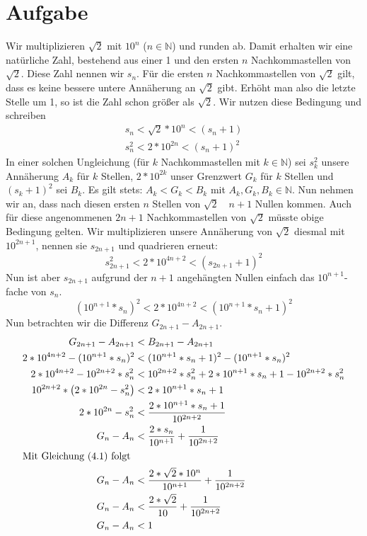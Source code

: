 \documentclass{article}
\numberwithin{equation}{section}
\begin{document}
\section{Aufgabe}
	Wir multiplizieren $\sqrt{2}$ mit $10^n$ ($n\in \mathbb{N}$) und runden ab. Damit erhalten wir eine natürliche Zahl, bestehend aus einer 1 und den ersten $n$ Nachkommastellen von $\sqrt{2}$. Diese Zahl nennen wir $s_n$. Für die ersten $n$ Nachkommastellen von $\sqrt{2}$ gilt, dass es keine bessere untere Annäherung an $\sqrt{2}$ gibt. Erhöht man also die letzte Stelle um 1, so ist die Zahl schon größer als $\sqrt{2}$. Wir nutzen diese Bedingung und schreiben
\begin{align}
    s_n<\sqrt{2}*10^{n}<(s_n+1)\\
	s_n^2<2*10^{2n}<(s_n+1)^2
\end{align}
	In einer solchen Ungleichung (für $k$ Nachkommastellen mit $k\in \mathbb{N}$) sei $s_k^2$ unsere Annäherung $A_k$ für $k$ Stellen, $2*10^{2k}$ unser Grenzwert $G_k$ für $k$ Stellen und $(s_k+1)^2$ sei $B_k$.
	Es gilt stets: $A_k<G_k<B_k$ mit $A_k,G_k,B_k\in\mathbb{N}$.
	Nun nehmen wir an, dass nach diesen ersten $n$ Stellen von $\sqrt{2}$\ \ $n+1$ Nullen kommen. Auch für diese angenommenen $2n+1$ Nachkommastellen von $\sqrt{2}$ müsste obige Bedingung gelten. Wir multiplizieren unsere Annäherung von $\sqrt{2}$ diesmal mit $10^{2n+1}$, nennen sie $s_{2n+1}$ und quadrieren erneut:
	\[s_{2n+1}^2<2*10^{4n+2}<(s_{2n+1}+1)^2\]
	Nun ist aber $s_{2n+1}$ aufgrund der $n+1$ angehängten Nullen einfach das $10^{n+1}$-fache von $s_n$.
	\[(10^{n+1}*s_n)^2<2*10^{4n+2}<(10^{n+1}*s_n+1)^2\]
	Nun betrachten wir die Differenz $G_{2n+1}-A_{2n+1}$.
	\begin{align*}
		G_{2n+1}-A_{2n+1}&<B_{2n+1}-A_{2n+1}\\
		2*10^{4n+2}-(10^{n+1}*s_n)^2&<(10^{n+1}*s_n+1)^2-(10^{n+1}*s_n)^2\\
		2*10^{4n+2}-10^{2n+2}*s_n^2&<10^{2n+2}*s_n^2+2*10^{n+1}*s_n+1-10^{2n+2}*s_n^2\\
		10^{2n+2}*\left(2*10^{2n}-s_n^2\right)&<2*10^{n+1}*s_n+1\\
		2*10^{2n}-s_n^2&<\frac{2*10^{n+1}*s_n+1}{10^{2n+2}}\\
		G_n-A_n&<\frac{2*s_n}{10^{n+1}}+\frac{1}{10^{2n+2}}\\
		\intertext{Mit Gleichung (4.1) folgt}
		G_n-A_n&<\frac{2*\sqrt{2}*10^{n}}{10^{n+1}}+\frac{1}{10^{2n+2}}\\
		G_n-A_n&<\frac{2*\sqrt{2}}{10}+\frac{1}{10^{2n+2}}\\
		G_n-A_n&<1
	\end{align*}
\end{document}
